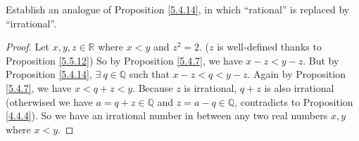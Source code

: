 \begin{exercise}\label{ex 5.5.5}
Establish an analogue of Proposition \ref{5.4.14}, in which ``rational'' is replaced by ``irrational''.
\end{exercise}

\begin{proof}
Let \(x, y, z \in \mathds{R}\) where \(x < y\) and \(z^2 = 2\).
(\(z\) is well-defined thanks to Proposition \ref{5.5.12})
So by Proposition \ref{5.4.7}, we have \(x - z < y - z\).
But by Proposition \ref{5.4.14}, \(\exists\ q \in \mathds{Q}\) such that \(x - z < q < y - z\).
Again by Proposition \ref{5.4.7}, we have \(x < q + z < y\).
Because \(z\) is irrational, \(q + z\) is also irrational
(otherwised we have \(a = q + z \in \mathds{Q}\) and \(z = a - q \in \mathds{Q}\), contradicts to Proposition \ref{4.4.4}).
So we have an irrational number in between any two real numbers \(x, y\) where \(x < y\).
\end{proof}